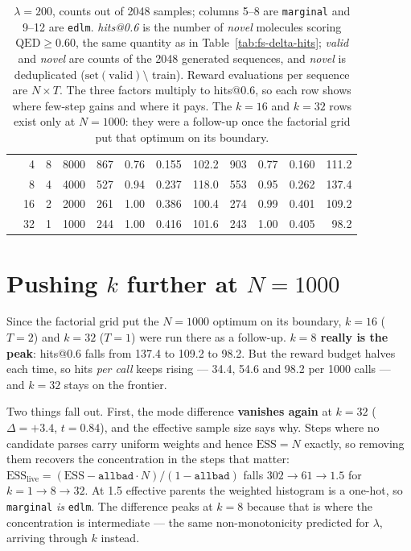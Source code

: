 \documentclass[11pt]{article}
\begin{document}
\begin{table}[htbp]
{\begin{tabular}{rrrr|rrrr|rrrr}
 & 4 & 8 & 8000 & 867 & 0.76 & 0.155 & 102.2 & 903 & 0.77 & 0.160 & 111.2 \\
 & 8 & 4 & 4000 & 527 & 0.94 & 0.237 & 118.0 & 553 & 0.95 & 0.262 & 137.4 \\
 & 16 & 2 & 2000 & 261 & 1.00 & 0.386 & 100.4 & 274 & 0.99 & 0.401 & 109.2 \\
 & 32 & 1 & 1000 & 244 & 1.00 & 0.416 & 101.6 & 243 & 1.00 & 0.405 & 98.2 \\
\bottomrule
\end{tabular}}
\caption{$\lambda=200$, counts out of 2048 samples; columns 5--8 are \texttt{marginal} and 9--12 are \texttt{edlm}. \emph{hits@0.6} is the number of \emph{novel} molecules scoring $\mathrm{QED}\ge0.60$, the same quantity as in Table~\ref{tab:fs-delta-hits}; \emph{valid} and \emph{novel} are counts of the 2048 generated sequences, and \emph{novel} is deduplicated ($\mathrm{set(valid)}\setminus$ train). Reward evaluations per sequence are $N\times T$. The three factors multiply to hits@0.6, so each row shows where few-step gains and where it pays. The $k=16$ and $k=32$ rows exist only at $N=1000$: they were a follow-up once the factorial grid put that optimum on its boundary.}
\label{tab:fs-tradeoff}
\end{table}


\section{Pushing $k$ further at $N=1000$}

Since the factorial grid put the $N=1000$ optimum on its boundary,
$k=16$ ($T=2$) and $k=32$ ($T=1$) were run there as a follow-up.
\textbf{$k=8$ really is the peak}: hits@0.6 falls from 137.4 to 109.2 to 98.2.
But the reward budget halves each time, so hits \emph{per call} keeps rising ---
34.4, 54.6 and 98.2 per 1000 calls --- and $k=32$ stays on the frontier.

Two things fall out. First, the mode difference \textbf{vanishes again} at
$k=32$ ($\Delta=+3.4$, $t=0.84$), and the effective sample size says why. Steps
where no candidate parses carry uniform weights and hence $\mathrm{ESS}=N$
exactly, so removing them recovers the concentration in the steps that matter:
$\mathrm{ESS}_{\text{live}} = (\mathrm{ESS} - \texttt{allbad}\cdot N)/(1-\texttt{allbad})$
falls $302 \to 61 \to 1.5$ for $k = 1 \to 8 \to 32$. At 1.5 effective parents the
weighted histogram is a one-hot, so \texttt{marginal} \emph{is} \texttt{edlm}.
The difference peaks at $k=8$ because that is where the concentration is
intermediate --- the same non-monotonicity predicted for $\lambda$, arriving
through $k$ instead.
\end{document}
